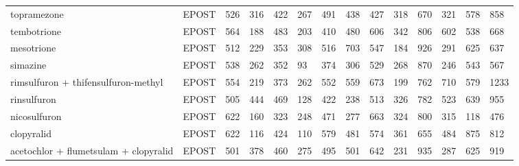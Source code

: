 \documentclass[agriculture,article,submit,moreauthors,pdftex]{mdpi}
\begin{document}
{\begin{tabular}{llllllllllllll}
  topramezone                              & EPOST        & 526                & 316               & 422              & 267             & 491              & 438              & 427          & 318          & 670          & 321         & 578            & 858           \\
  tembotrione                              & EPOST        & 564                & 188               & 483              & 203             & 410              & 480              & 606          & 342          & 806          & 602         & 538            & 668           \\
  mesotrione                               & EPOST        & 512                & 229               & 353              & 308             & 516              & 703              & 547          & 184          & 926          & 291         & 625            & 637           \\
  simazine                                 & EPOST        & 538                & 262               & 352              & 93              & 374              & 306              & 529          & 268          & 870          & 246         & 543            & 567           \\
  rimsulfuron + thifensulfuron-methyl      & EPOST        & 554                & 219               & 373              & 262             & 552              & 559              & 673          & 199          & 762          & 710         & 579            & 1233          \\
  rinsulfuron                              & EPOST        & 505                & 444               & 469              & 128             & 422              & 238              & 513          & 326          & 782          & 523         & 639            & 955           \\
  nicosulfuron                             & EPOST        & 622                & 160               & 323              & 248             & 471              & 277              & 663          & 324          & 800          & 315         & 118            & 476           \\
  clopyralid                               & EPOST        & 622                & 116               & 424              & 110             & 579              & 481              & 574          & 361          & 655          & 484         & 875            & 812           \\
  acetochlor + flumetsulam + clopyralid    & EPOST        & 501                & 378               & 460              & 275             & 495              & 501              & 642          & 231          & 935          & 287         & 625            & 919           \\

\end{tabular}}
\end{document}
